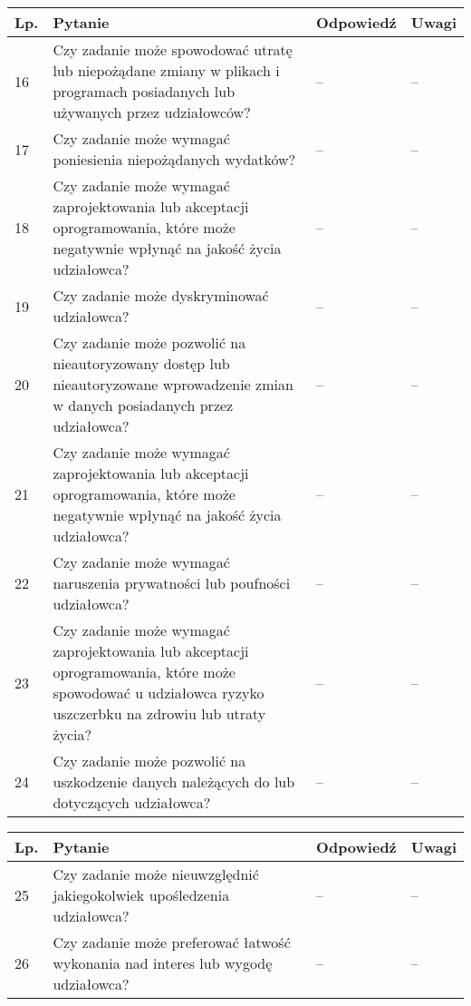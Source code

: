 \documentclass[11pt,oneside,a4paper,titlepage,onecolumn]{article}
\begin{document}
\begin{tabularx}{\textwidth}{|l|X|l|X|}
    \hline
    Lp. & Pytanie & Odpowiedź & Uwagi \\ \hline
    
	16
	& Czy zadanie może spowodować utratę lub niepożądane zmiany w plikach i
    programach posiadanych lub używanych przez udziałowców?
	& --
	& --
	\\\hline
	
	17
	& Czy zadanie może wymagać poniesienia niepożądanych wydatków?
	& --
	& --
	\\\hline
	
	18
	& Czy zadanie może wymagać zaprojektowania lub akceptacji oprogramowania,
    które może negatywnie wpłynąć na jakość życia udziałowca?
	& --
	& --
	\\\hline
	
	19
	& Czy zadanie może dyskryminować udziałowca?
	& --
	& --
	\\\hline
	
	20
	& Czy zadanie może pozwolić na nieautoryzowany dostęp lub nieautoryzowane
    wprowadzenie zmian w danych posiadanych przez udziałowca?
	& --
	& --
	\\\hline
	
	21
	& Czy zadanie może wymagać zaprojektowania lub akceptacji oprogramowania,
    które może negatywnie wpłynąć na jakość życia udziałowca?
	& --
	& --
	\\\hline
	
	22
	& Czy zadanie może wymagać naruszenia prywatności lub poufności udziałowca?
	& --
	& --
	\\\hline
	
	23
	& Czy zadanie może wymagać zaprojektowania lub akceptacji oprogramowania,
    które może spowodować u udziałowca ryzyko uszczerbku na zdrowiu lub utraty
    życia?
	& --
	& --
	\\\hline
	
	24
	& Czy zadanie może pozwolić na uszkodzenie danych należących do lub
    dotyczących udziałowca?
	& --
	& --
	\\\hline
\end{tabularx}

\begin{tabularx}{\textwidth}{|l|X|l|X|}
    \hline
    Lp. & Pytanie & Odpowiedź & Uwagi \\ \hline
    
	25
	& Czy zadanie może nieuwzględnić jakiegokolwiek upośledzenia udziałowca?
	& --
	& --
	\\\hline
    
	26
	& Czy zadanie może preferować łatwość wykonania nad interes lub wygodę
    udziałowca?
	& --
	& --
	\\\hline
\end{tabularx}
\end{document}
